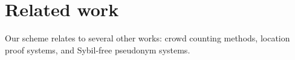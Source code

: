 \section{Related work}%
\label{related-work}

Our scheme relates to several other works: crowd counting methods, location 
proof systems, and Sybil-free pseudonym systems.





